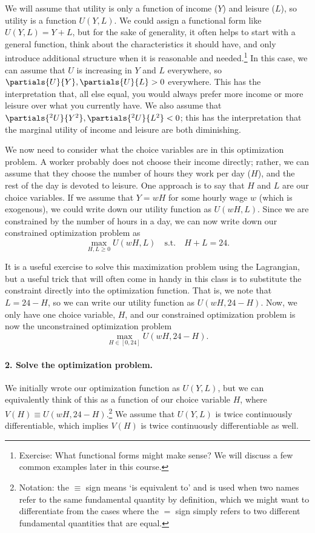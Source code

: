 We will assume that utility is only a function of income ($Y$) and leisure ($L$), so utility is a function $U(Y, L)$. We could assign a functional form like $U(Y, L) = Y + L$, but for the sake of generality, it often helps to start with a general function, think about the characteristics it should have, and only introduce additional structure when it is reasonable and needed.\footnote{Exercise: What functional forms might make sense? We will discuss a few common examples later in this course.} In this case, we can assume that $U$ is increasing in $Y$ and $L$ everywhere, so $\partials{U}{Y}, \partials{U}{L} > 0$ everywhere. This has the interpretation that, all else equal, you would always prefer more income or more leisure over what you currently have. We also assume that $\partials{^2 U}{Y^2}, \partials{^2 U}{L^2} < 0$; this has the interpretation that the marginal utility of income and leisure are both diminishing.

We now need to consider what the choice variables are in this optimization problem. A worker probably does not choose their income directly; rather, we can assume that they choose the number of hours they work per day ($H$), and the rest of the day is devoted to leisure. One approach is to say that $H$ and $L$ are our choice variables. If we assume that $Y = wH$ for some hourly wage $w$ (which is exogenous), we could write down our utility function as $U(wH, L)$. Since we are constrained by the number of hours in a day, we can now write down our constrained optimization problem as 
$$\max_{H, L \geq 0} U(wH, L) \quad \text{s.t.} \quad H + L = 24.$$

It is a useful exercise to solve this maximization problem using the Lagrangian, but a useful trick that will often come in handy in this class is to substitute the constraint directly into the optimization function. That is, we note that $L = 24 - H$, so we can write our utility function as $U(wH, 24 - H)$. Now, we only have one choice variable, $H$, and our constrained optimization problem is now the unconstrained optimization problem
$$\max_{H \in [0, 24]} U(wH, 24 - H).$$

\paragraph{2. Solve the optimization problem.}

We initially wrote our optimization function as $U(Y, L)$, but we can equivalently think of this as a function of our choice variable $H$, where $V(H) \equiv U(wH, 24 - H)$.\footnote{Notation: the $\equiv$ sign means `is equivalent to' and is used when two names refer to the same fundamental quantity by definition, which we might want to differentiate from the cases where the $=$ sign simply refers to two different fundamental quantities that are equal.} We assume that $U(Y, L)$ is twice continuously differentiable, which implies $V(H)$ is twice continuously differentiable as well. 


